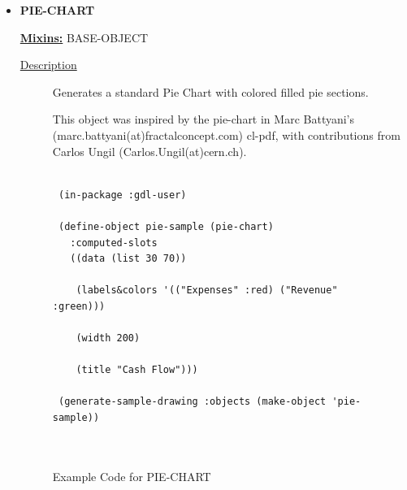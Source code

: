 \documentclass [11pt]{book}
\begin{document}
\begin{itemize}
\item {}
\label{prim:pie-chart}
\textbf{PIE-CHART}


\textbf{
\underline{Mixins:}} BASE-OBJECT





\begin{description}

\item [
\underline{Description}]


Generates a standard Pie Chart with colored filled pie sections.

This object was inspired by the pie-chart in Marc Battyani's (marc.battyani(at)fractalconcept.com)
cl-pdf, with contributions from Carlos Ungil (Carlos.Ungil(at)cern.ch).



\end{description}




\begin{figure}
\begin{lrbox}{\boxedverb}
\begin{minipage}{\linewidth}
{\small

\begin{verbatim}

 (in-package :gdl-user)
 
 (define-object pie-sample (pie-chart)
   :computed-slots
   ((data (list 30 70))
   
    (labels&colors '(("Expenses" :red) ("Revenue" :green)))
   
    (width 200) 
   
    (title "Cash Flow")))

 (generate-sample-drawing :objects (make-object 'pie-sample))

 
\end{verbatim}}
\end{minipage}
\end{lrbox}
\fbox{\usebox{\boxedverb}}

\caption{Example Code for PIE-CHART}

\label{fig:example-code-PIE-CHART}

\end{figure}


\end{itemize}
\end{document}
